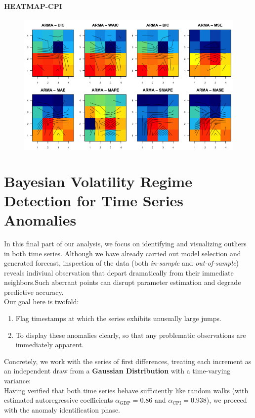 \documentclass{Configuration_Files/PoliMi3i_thesis}
\begin{document}
\subsubsection{HEATMAP-CPI}
\begin{figure}[H]
    \centering
    \includegraphics[width=0.75\linewidth]{HEATMAP_CPI.png}
\end{figure}






\newpage
\chapter{Bayesian Volatility Regime Detection for Time Series Anomalies}
In this final part of our analysis, we focus on identifying and visualizing outliers in both time series. Although we have already carried out model selection and generated forecast, inspection of the data (both \textit{in-sample} and \textit{out-of-sample}) reveals indiviual observation that depart dramatically from their immediate neighbors.Such aberrant points can disrupt parameter estimation and degrade predictive accuracy.\\
Our goal here is twofold:
\begin{enumerate}
    \item Flag timestamps at which the series exhibits unusually large jumps.
    \item To display these anomalies clearly, so that any problematic observations are immediately apparent.
\end{enumerate}
Concretely, we work with the series of first differences, treating each increment as an independent draw from a \textbf{Gaussian Distribution} with a time-varying variance:\\
Having verified that both time series behave sufficiently like random walks (with estimated autoregressive coefficients \(\alpha_{\text{GDP}} = 0.86\) and \(\alpha_{\text{CPI}} = 0.938\)), we proceed with the anomaly identification phase.
\end{document}
